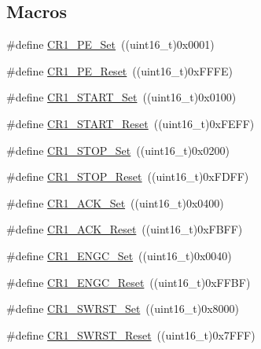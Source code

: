 \subsection*{Macros}
\begin{DoxyCompactItemize}
\item 
\#define \hyperlink{group___i2_c___private___defines_ga913b708338087f3ffc2fba2b05a38917}{C\+R1\+\_\+\+P\+E\+\_\+\+Set}~((uint16\+\_\+t)0x0001)
\item 
\#define \hyperlink{group___i2_c___private___defines_ga21dc289f16c502a2bc0a88e1514a8ee0}{C\+R1\+\_\+\+P\+E\+\_\+\+Reset}~((uint16\+\_\+t)0x\+F\+F\+F\+E)
\item 
\#define \hyperlink{group___i2_c___private___defines_ga53820dd338da9779d039718148184ef9}{C\+R1\+\_\+\+S\+T\+A\+R\+T\+\_\+\+Set}~((uint16\+\_\+t)0x0100)
\item 
\#define \hyperlink{group___i2_c___private___defines_gacc62242e31a380aec2ef9f836b3cf19d}{C\+R1\+\_\+\+S\+T\+A\+R\+T\+\_\+\+Reset}~((uint16\+\_\+t)0x\+F\+E\+F\+F)
\item 
\#define \hyperlink{group___i2_c___private___defines_gac14ffc5548d2c30d21c49612c57e52be}{C\+R1\+\_\+\+S\+T\+O\+P\+\_\+\+Set}~((uint16\+\_\+t)0x0200)
\item 
\#define \hyperlink{group___i2_c___private___defines_gac44124bc7b468c7dee8188712e407e02}{C\+R1\+\_\+\+S\+T\+O\+P\+\_\+\+Reset}~((uint16\+\_\+t)0x\+F\+D\+F\+F)
\item 
\#define \hyperlink{group___i2_c___private___defines_ga1f74487a0fbffdcd8a4c440c732dc316}{C\+R1\+\_\+\+A\+C\+K\+\_\+\+Set}~((uint16\+\_\+t)0x0400)
\item 
\#define \hyperlink{group___i2_c___private___defines_gaa8bcbe2f6089d896aff8e7770368aada}{C\+R1\+\_\+\+A\+C\+K\+\_\+\+Reset}~((uint16\+\_\+t)0x\+F\+B\+F\+F)
\item 
\#define \hyperlink{group___i2_c___private___defines_gadcd99a681046a2315f4bc72c9f461f0e}{C\+R1\+\_\+\+E\+N\+G\+C\+\_\+\+Set}~((uint16\+\_\+t)0x0040)
\item 
\#define \hyperlink{group___i2_c___private___defines_gab51161052b055a5eecb0aad447a776e5}{C\+R1\+\_\+\+E\+N\+G\+C\+\_\+\+Reset}~((uint16\+\_\+t)0x\+F\+F\+B\+F)
\item 
\#define \hyperlink{group___i2_c___private___defines_ga0e067bb108052ea0e8e49feb194c2ca0}{C\+R1\+\_\+\+S\+W\+R\+S\+T\+\_\+\+Set}~((uint16\+\_\+t)0x8000)
\item 
\#define \hyperlink{group___i2_c___private___defines_gab41b615034ed8f830ef4900a0fcefc39}{C\+R1\+\_\+\+S\+W\+R\+S\+T\+\_\+\+Reset}~((uint16\+\_\+t)0x7\+F\+F\+F)

\end{DoxyCompactItemize}
